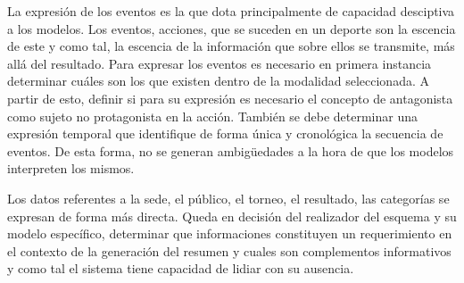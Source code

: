     La expresión de los eventos es la que dota principalmente de capacidad desciptiva a los modelos. Los eventos, acciones, que se suceden en un deporte son la escencia de 
este y como tal, la escencia de la información que sobre ellos se transmite, más allá del resultado. Para expresar los eventos es necesario en primera instancia determinar cuáles 
son los que existen dentro de la modalidad seleccionada. A partir de esto, definir si para su expresión es necesario el concepto de antagonista como sujeto no protagonista en la acción.
También se debe determinar una expresión temporal que identifique de forma única y cronológica la secuencia de eventos. De esta forma, no se generan ambigüedades a la hora de que los 
modelos interpreten los mismos.

    Los datos referentes a la sede, el público, el torneo, el resultado, las categorías se expresan de forma más directa. Queda en decisión del realizador del esquema y su modelo específico, 
determinar que informaciones constituyen un requerimiento en el contexto de la generación del resumen y cuales son complementos informativos y como tal el sistema tiene 
capacidad de lidiar con su ausencia. 



